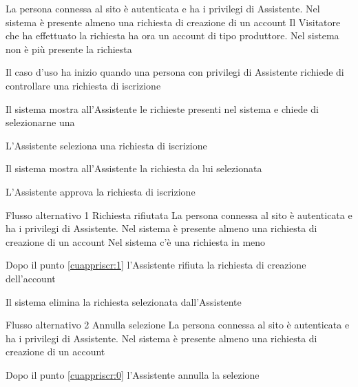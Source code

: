 {}
{La persona connessa al sito è autenticata e ha i privilegi di  Assistente. Nel sistema è presente almeno una richiesta di creazione di un account}
{Il Visitatore che ha effettuato la richiesta ha ora un account di tipo produttore. Nel sistema non è più presente la richiesta}
{\begin{enumCU}
	\item Il caso d'uso ha inizio quando una persona con privilegi di Assistente richiede di controllare una richiesta di iscrizione
	\item Il sistema mostra all'Assistente le richieste presenti nel sistema e chiede di selezionarne una\label{cuappriscr:0}
	\item L'Assistente seleziona una richiesta di iscrizione
	\item Il sistema mostra all'Assistente la richiesta da lui selezionata\label{cuappriscr:1}
	\item L'Assistente approva la richiesta di iscrizione
\end{enumCU}}
%
{Flusso alternativo 1}%
{Richiesta rifiutata}%
{La persona connessa al sito è autenticata e ha i privilegi di  Assistente. Nel sistema è presente almeno una richiesta di creazione di un account}%
{Nel sistema c'è una richiesta in meno}%
{\begin{enumCU}
		\item Dopo il punto \ref{cuappriscr:1} l'Assistente rifiuta la richiesta di creazione dell'account
		\item Il sistema elimina la richiesta selezionata dall'Assistente
\end{enumCU}}%
%
{Flusso alternativo 2}%
{Annulla selezione}%
{La persona connessa al sito è autenticata e ha i privilegi di  Assistente. Nel sistema è presente almeno una richiesta di creazione di un account}%
{\postNulle}%
{\begin{enumCU}
		\item Dopo il punto \ref{cuappriscr:0} l'Assistente annulla la selezione
\end{enumCU}}%

